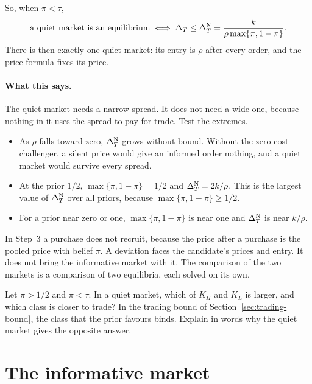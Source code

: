 So, when \(\pi<\tau\),
\begin{equation}\label{eq:coexistence-quiet}
\text{a quiet market is an equilibrium}\iff\Delta_T\le\Delta_T^{\rm N}=\frac{k}{\rho\max\{\pi,1-\pi\}} .
\end{equation}
There is then exactly one quiet market: its entry is \(\rho\) after every order, and the price formula fixes its
price.

\paragraph{What this says.} The quiet market needs a narrow spread. It does not need a wide one, because nothing in it
uses the spread to pay for trade. Test the extremes.
\begin{itemize}
\item As \(\rho\) falls toward zero, \(\Delta_T^{\rm N}\) grows without bound. Without the zero-cost challenger, a silent
price would give an informed order nothing, and a quiet market would survive every spread.
\item At the prior \(1/2\), \(\max\{\pi,1-\pi\}=1/2\) and \(\Delta_T^{\rm N}=2k/\rho\). This is the largest value of
\(\Delta_T^{\rm N}\) over all priors, because \(\max\{\pi,1-\pi\}\ge1/2\).
\item For a prior near zero or one, \(\max\{\pi,1-\pi\}\) is near one and \(\Delta_T^{\rm N}\) is near \(k/\rho\).
\end{itemize}

\begin{watchout}
In Step~3 a purchase does not recruit, because the price after a purchase is the pooled price with belief \(\pi\). A
deviation faces the candidate's prices and entry. It does not bring the informative market with it. The comparison of
the two markets is a comparison of two equilibria, each solved on its own.
\end{watchout}

\begin{checkyourself}\label{q:coexistence-binds}
Let \(\pi>1/2\) and \(\pi<\tau\). In a quiet market, which of \(K_H\) and \(K_L\) is larger, and which class is
closer to trade? In the trading bound of Section~\ref{sec:trading-bound}, the class that the prior favours binds.
Explain in words why the quiet market gives the opposite answer.
\end{checkyourself}

\section{The informative market}\label{sec:coexistence-informative}

